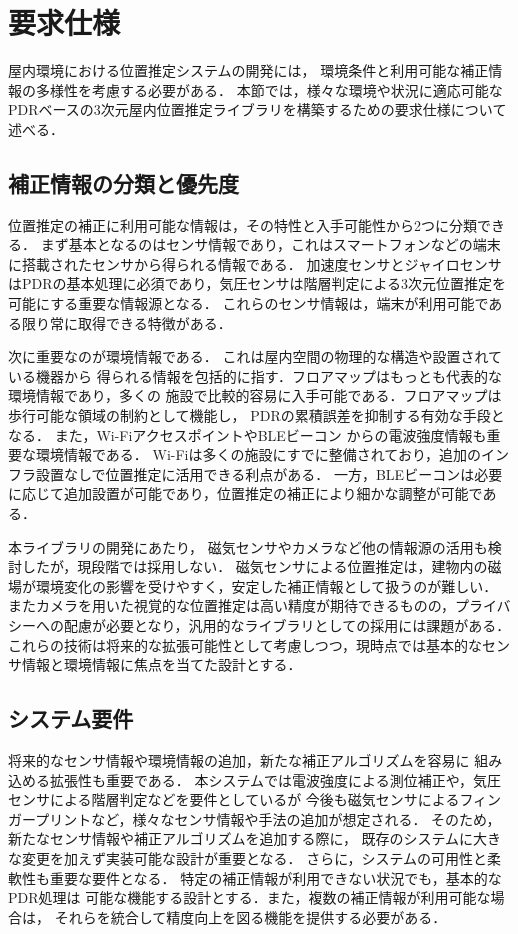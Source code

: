 

\section{要求仕様}

屋内環境における位置推定システムの開発には，
環境条件と利用可能な補正情報の多様性を考慮する必要がある．
本節では，様々な環境や状況に適応可能なPDRベースの3次元屋内位置推定ライブラリを構築するための要求仕様について述べる．

\subsection{補正情報の分類と優先度}

位置推定の補正に利用可能な情報は，その特性と入手可能性から2つに分類できる．
まず基本となるのはセンサ情報であり，これはスマートフォンなどの端末に搭載されたセンサから得られる情報である．
加速度センサとジャイロセンサはPDRの基本処理に必須であり，気圧センサは階層判定による3次元位置推定を可能にする重要な情報源となる．
これらのセンサ情報は，端末が利用可能である限り常に取得できる特徴がある．

次に重要なのが環境情報である．
これは屋内空間の物理的な構造や設置されている機器から
得られる情報を包括的に指す．フロアマップはもっとも代表的な環境情報であり，多くの
施設で比較的容易に入手可能である．フロアマップは歩行可能な領域の制約として機能し，
PDRの累積誤差を抑制する有効な手段となる．
また，Wi-FiアクセスポイントやBLEビーコン
からの電波強度情報も重要な環境情報である．
Wi-Fiは多くの施設にすでに整備されており，追加のインフラ設置なしで位置推定に活用できる利点がある．
一方，BLEビーコンは必要に応じて追加設置が可能であり，位置推定の補正により細かな調整が可能である．

本ライブラリの開発にあたり，
磁気センサやカメラなど他の情報源の活用も検討したが，現段階では採用しない．
磁気センサによる位置推定は，建物内の磁場が環境変化の影響を受けやすく，安定した補正情報として扱うのが難しい．
またカメラを用いた視覚的な位置推定は高い精度が期待できるものの，プライバシーへの配慮が必要となり，汎用的なライブラリとしての採用には課題がある．
これらの技術は将来的な拡張可能性として考慮しつつ，現時点では基本的なセンサ情報と環境情報に焦点を当てた設計とする．

\subsection{システム要件}

将来的なセンサ情報や環境情報の追加，新たな補正アルゴリズムを容易に
組み込める拡張性も重要である．
本システムでは電波強度による測位補正や，気圧センサによる階層判定などを要件としているが
今後も磁気センサによるフィンガープリントなど，様々なセンサ情報や手法の追加が想定される．
そのため，新たなセンサ情報や補正アルゴリズムを追加する際に，
既存のシステムに大きな変更を加えず実装可能な設計が重要となる．
さらに，システムの可用性と柔軟性も重要な要件となる．
特定の補正情報が利用できない状況でも，基本的なPDR処理は
可能な機能する設計とする．また，複数の補正情報が利用可能な場合は，
それらを統合して精度向上を図る機能を提供する必要がある．



